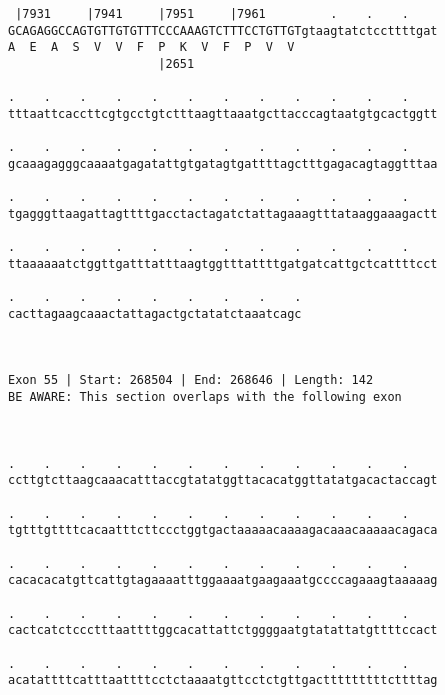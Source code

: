 \documentclass{article}
\begin{document}
\begin{Verbatim}
 |7931     |7941     |7951     |7961         .    .    .    
GCAGAGGCCAGTGTTGTGTTTCCCAAAGTCTTTCCTGTTGTgtaagtatctccttttgat
A  E  A  S  V  V  F  P  K  V  F  P  V  V                    
                     |2651                                  
  
.    .    .    .    .    .    .    .    .    .    .    .    
tttaattcaccttcgtgcctgtctttaagttaaatgcttacccagtaatgtgcactggtt
                                                            
.    .    .    .    .    .    .    .    .    .    .    .    
gcaaagagggcaaaatgagatattgtgatagtgattttagctttgagacagtaggtttaa
                                                            
.    .    .    .    .    .    .    .    .    .    .    .    
tgagggttaagattagttttgacctactagatctattagaaagtttataaggaaagactt
                                                            
.    .    .    .    .    .    .    .    .    .    .    .    
ttaaaaaatctggttgatttatttaagtggtttattttgatgatcattgctcattttcct
                                                            
.    .    .    .    .    .    .    .    .
cacttagaagcaaactattagactgctatatctaaatcagc
                                         
                                         
 
Exon 55 | Start: 268504 | End: 268646 | Length: 142
BE AWARE: This section overlaps with the following exon



.    .    .    .    .    .    .    .    .    .    .    .    
ccttgtcttaagcaaacatttaccgtatatggttacacatggttatatgacactaccagt
                                                            
.    .    .    .    .    .    .    .    .    .    .    .    
tgtttgttttcacaatttcttccctggtgactaaaaacaaaagacaaacaaaaacagaca
                                                            
.    .    .    .    .    .    .    .    .    .    .    .    
cacacacatgttcattgtagaaaatttggaaaatgaagaaatgccccagaaagtaaaaag
                                                            
.    .    .    .    .    .    .    .    .    .    .    .    
cactcatctccctttaattttggcacattattctggggaatgtatattatgttttccact
                                                            
.    .    .    .    .    .    .    .    .    .    .    .    
acatattttcatttaattttcctctaaaatgttcctctgttgactttttttttcttttag
                                                            

\end{Verbatim}
\end{document}
